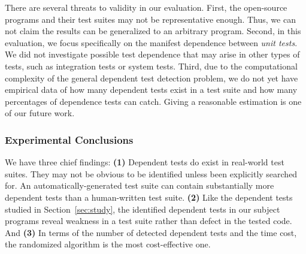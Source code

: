 There are several threats to validity in our evaluation.
First, the \subjnum open-source
programs and their test suites may not be
representative enough. Thus, we can not claim the results
can be generalized to an arbitrary program.
Second, in this evaluation, we focus specifically on
the {manifest dependence} between \textit{unit tests}.
We did not investigate possible test dependence that may arise
in other types of tests, such as integration tests
or system tests.
Third, due to the computational complexity of the general dependent test
detection problem, we do not yet have
empirical data of how many dependent
tests exist in a test suite and how many percentages of dependence tests
\ourtool can catch.  Giving a reasonable estimation is one of our future work.


\subsubsection{Experimental Conclusions}


We have three chief findings: \textbf{(1)}
Dependent tests do exist in real-world test suites.
They may not be obvious to be identified
unless been explicitly searched for.
An automatically-generated test suite can contain
substantially more dependent tests than a human-written
test suite.
\textbf{(2)} Like the dependent tests
studied in Section~\ref{sec:study}, the identified
dependent tests in our subject programs reveal weakness
in a test suite rather than defect in the tested code.
And \textbf{(3)} In terms
of the number of detected dependent tests
and the time cost, the randomized algorithm is the
most cost-effective one.

